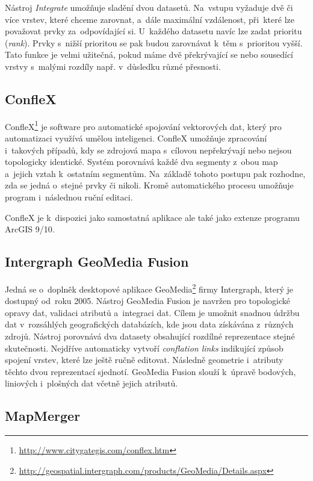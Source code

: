 Nástroj \textit{Integrate} umožňuje sladění dvou datasetů. Na~vstupu vyžaduje 
dvě či více vrstev, které chceme zarovnat, a~dále maximální vzdálenost, při~které
lze považovat prvky za~odpovídající si. U~každého datasetu navíc lze zadat 
prioritu (\textit{rank}). Prvky s~nižší prioritou se pak budou zarovnávat 
k~těm s~prioritou vyšší. Tato funkce je velmi užitečná, pokud máme dvě 
překrývající se nebo sousedící vrstvy s~malými rozdíly např. v~důsledku různé
přesnosti.


\subsection{ConfleX}
\label{conflex}

ConfleX\footnote{\url{http://www.citygategis.com/conflex.htm}} 
je software pro automatické spojování vektorových  dat,
který pro automatizaci využívá umělou inteligenci. ConfleX umožňuje zpracování 
i~takových případů, kdy se zdrojová mapa s~cílovou nepřekrývají nebo nejsou 
topologicky identické. Systém porovnává každé dva segmenty z~obou map a~jejich
vztah k~ostatním segmentům. Na~základě tohoto postupu pak rozhodne, zda se 
jedná o~stejné prvky či nikoli. Kromě automatického procesu umožňuje program 
i~následnou ruční editaci.

ConfleX je k~dispozici jako samostatná aplikace ale také jako extenze 
programu ArcGIS 9/10.


\subsection{Intergraph GeoMedia Fusion}
\label{geomedia}

Jedná se o~doplněk desktopové aplikace 
GeoMedia\footnote{\url{http://geospatial.intergraph.com/products/GeoMedia/Details.aspx}}
firmy Intergraph, který je dostupný od~roku 2005. Nástroj GeoMedia Fusion  
je navržen pro topologické opravy dat, validaci atributů a~integraci dat. Cílem 
je umožnit snadnou údržbu dat v~rozsáhlých geografických databázích, kde jsou 
data získávána z~různých zdrojů. Nástroj porovnává dva datasety obsahující 
rozdílné reprezentace stejné skutečnosti. Nejdříve automaticky vytvoří 
\textit{conflation links} indikující způsob spojení vrstev, které lze ještě
ručně editovat. Následně geometrie i~atributy těchto dvou reprezentací
sjednotí. GeoMedia Fusion slouží k~úpravě bodových, liniových i~plošných dat
včetně jejich atributů. 


\subsection{MapMerger}
\label{mapmerger}

